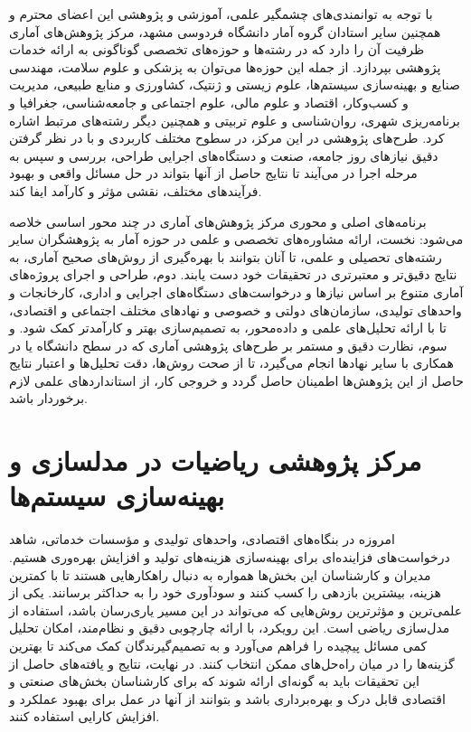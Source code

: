 \documentclass[
  letterpaper,
  DIV=11,
  numbers=noendperiod]{scrreprt}
\begin{document}
با توجه به توانمندی‌های چشمگیر علمی، آموزشی و پژوهشی این اعضای محترم و
همچنین سایر استادان گروه آمار دانشگاه فردوسی مشهد، مرکز پژوهش‌های آماری
ظرفیت آن را دارد که در رشته‌ها و حوزه‌های تخصصی گوناگونی به ارائه خدمات
پژوهشی بپردازد. از جمله این حوزه‌ها می‌توان به پزشکی و علوم سلامت، مهندسی
صنایع و بهینه‌سازی سیستم‌ها، علوم زیستی و ژنتیک، کشاورزی و منابع طبیعی،
مدیریت و کسب‌وکار، اقتصاد و علوم مالی، علوم اجتماعی و جامعه‌شناسی، جغرافیا
و برنامه‌ریزی شهری، روان‌شناسی و علوم تربیتی و همچنین دیگر رشته‌های مرتبط
اشاره کرد. طرح‌های پژوهشی در این مرکز، در سطوح مختلف کاربردی و با در نظر
گرفتن دقیق نیازهای روز جامعه، صنعت و دستگاه‌های اجرایی طراحی، بررسی و سپس
به مرحله اجرا در می‌آیند تا نتایج حاصل از آنها بتواند در حل مسائل واقعی و
بهبود فرآیندهای مختلف، نقشی مؤثر و کارآمد ایفا کند.

برنامه‌های اصلی و محوری مرکز پژوهش‌های آماری در چند محور اساسی خلاصه
می‌شود: نخست، ارائه مشاوره‌های تخصصی و علمی در حوزه آمار به پژوهشگران سایر
رشته‌های تحصیلی و علمی، تا آنان بتوانند با بهره‌گیری از روش‌های صحیح آماری،
به نتایج دقیق‌تر و معتبرتری در تحقیقات خود دست یابند. دوم، طراحی و اجرای
پروژه‌های آماری متنوع بر اساس نیازها و درخواست‌های دستگاه‌های اجرایی و
اداری، کارخانجات و واحدهای تولیدی، سازمان‌های دولتی و خصوصی و نهادهای
مختلف اجتماعی و اقتصادی، تا با ارائه تحلیل‌های علمی و داده‌محور، به
تصمیم‌سازی بهتر و کارآمدتر کمک شود. و سوم، نظارت دقیق و مستمر بر طرح‌های
پژوهشی آماری که در سطح دانشگاه یا در همکاری با سایر نهادها انجام می‌گیرد،
تا از صحت روش‌ها، دقت تحلیل‌ها و اعتبار نتایج حاصل از این پژوهش‌ها اطمینان
حاصل گردد و خروجی کار، از استانداردهای علمی لازم برخوردار باشد.

\section{مرکز پژوهشی ریاضیات در مدلسازی و بهینه‌سازی
سیستم‌ها}\label{ux645ux631ux6a9ux632-ux67eux698ux648ux647ux634ux6cc-ux631ux6ccux627ux636ux6ccux627ux62a-ux62fux631-ux645ux62fux644ux633ux627ux632ux6cc-ux648-ux628ux647ux6ccux646ux647ux633ux627ux632ux6cc-ux633ux6ccux633ux62aux645ux647ux627}

امروزه در بنگاه‌های اقتصادی، واحدهای تولیدی و مؤسسات خدماتی، شاهد
درخواست‌های فزاینده‌ای برای بهینه‌سازی هزینه‌های تولید و افزایش بهره‌وری
هستیم. مدیران و کارشناسان این بخش‌ها همواره به دنبال راهکارهایی هستند تا
با کمترین هزینه، بیشترین بازدهی را کسب کنند و سودآوری خود را به حداکثر
برسانند. یکی از علمی‌ترین و مؤثرترین روش‌هایی که می‌تواند در این مسیر
یاری‌رسان باشد، استفاده از مدل‌سازی ریاضی است. این رویکرد، با ارائه
چارچوبی دقیق و نظام‌مند، امکان تحلیل کمی مسائل پیچیده را فراهم می‌آورد و
به تصمیم‌گیرندگان کمک می‌کند تا بهترین گزینه‌ها را در میان راه‌حل‌های ممکن
انتخاب کنند. در نهایت، نتایج و یافته‌های حاصل از این تحقیقات باید به
گونه‌ای ارائه شوند که برای کارشناسان بخش‌های صنعتی و اقتصادی قابل درک و
بهره‌برداری باشد و بتوانند از آنها در عمل برای بهبود عملکرد و افزایش
کارایی استفاده کنند.
\end{document}
